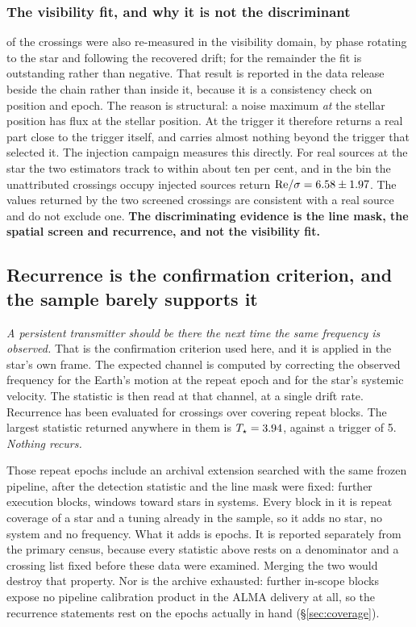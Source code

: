 \subsubsection{The visibility fit, and why it is not the discriminant}
\label{sec:vistest}

\LgNFit{} of the \NCross{} crossings were also re-measured in the visibility
domain, by phase rotating to the star and following the recovered drift; for
the remainder the fit is outstanding rather than negative. That result is
reported in the data release beside the chain rather than inside it, because
it is a consistency check on position and epoch. The reason is structural: a
noise maximum \emph{at} the stellar position has flux at the stellar
position. At the trigger it therefore returns a real part close to the
trigger itself, and carries almost nothing beyond the trigger that selected
it. The injection campaign measures this directly. For real sources at the
star the two estimators track to within about ten per cent, and in the bin
the unattributed crossings occupy injected sources return
${\rm Re}/\sigma=6.58\pm1.97$. The values returned
by the two screened crossings are consistent with a real source and do not
exclude one. \textbf{The discriminating evidence is the line mask, the
spatial screen and recurrence, and not the visibility fit.}

\subsection{Recurrence is the confirmation criterion, and the sample barely
supports it} \label{sec:etacrv}

\emph{A persistent transmitter should be there the next time the same
frequency is observed.} That is the confirmation criterion used here, and it
is applied in the star's own frame. The expected channel is computed by
correcting the observed frequency for the Earth's motion at the repeat epoch
and for the star's systemic velocity. The statistic is then read at that
channel, at a single drift rate. Recurrence has been evaluated for
\LgNRecurTested{} crossings over \LgNRecurRepeats{} covering repeat blocks.
The largest statistic returned anywhere in them is
$T_\star=3.94$, against a trigger of 5. \emph{Nothing recurs.}

Those repeat epochs include an archival extension searched with the same
frozen pipeline, after the detection statistic and the line mask were fixed:
\ExtBlocks{} further execution blocks, \ExtWindows{} windows toward
\ExtStars{} stars in \ExtSystems{} systems. Every block in it is repeat
coverage of a star and a tuning already in the sample, so it adds no star,
no system and no frequency. What it adds is epochs. It is reported
separately from the primary census, because every statistic above rests on a
denominator and a crossing list fixed before these data were examined.
Merging the two would destroy that property. Nor is the archive exhausted:
\FateNoCal{} further in-scope blocks expose no pipeline calibration product
in the ALMA delivery at all, so the recurrence statements rest on the epochs
actually in hand (\S\ref{sec:coverage}).

